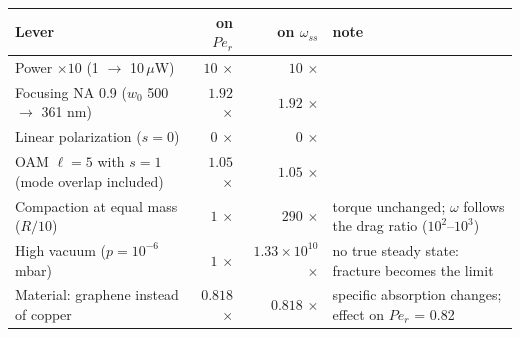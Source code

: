 \begin{tabular}{p{6.2cm}rrp{5.2cm}}
\hline
Lever & on $Pe_r$ & on $\omega_{ss}$ & note \\
\hline
Power $\times10$ (1 $\to$ 10\,$\mu$W) & $10$ $\times$ & $10$ $\times$ &  \\
Focusing NA 0.9 ($w_0$ 500 $\to$ 361 nm) & $1.92$ $\times$ & $1.92$ $\times$ &  \\
Linear polarization ($s=0$) & $0$ $\times$ & $0$ $\times$ &  \\
OAM $\ell=5$ with $s=1$ (mode overlap included) & $1.05$ $\times$ & $1.05$ $\times$ &  \\
Compaction at equal mass ($R/10$) & $1$ $\times$ & $290$ $\times$ & torque unchanged; $\omega$ follows the drag ratio ($10^2$--$10^3$) \\
High vacuum ($p=10^{-6}$ mbar) & $1$ $\times$ & $1.33\times10^{10}$ $\times$ & no true steady state: fracture becomes the limit \\
Material: graphene instead of copper & $0.818$ $\times$ & $0.818$ $\times$ & specific absorption changes; effect on $Pe_r$ = 0.82 \\
\hline
\end{tabular}
